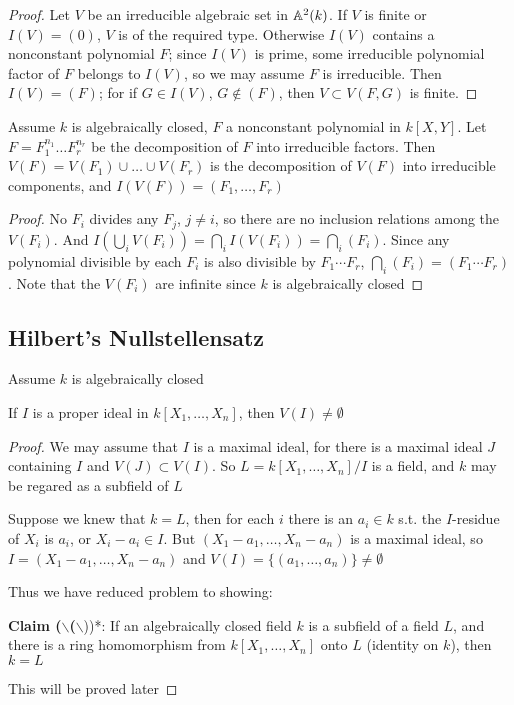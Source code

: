 \documentclass[11pt]{article}
\begin{document}
\begin{proof}
Let \(V\) be an irreducible algebraic set in \(\mathbb{A}^2(k)\). If \(V\) is finite
or \(I(V)=(0)\), \(V\) is of the required type. Otherwise \(I(V)\) contains a nonconstant
polynomial \(F\); since \(I(V)\) is prime, some irreducible polynomial factor of \(F\) belongs
to \(I(V)\), so we may assume \(F\) is irreducible. Then \(I(V)=(F)\); for
if \(G\in I(V)\), \(G\notin(F)\), then \(V\subset V(F,G)\) is finite.
\end{proof}

\begin{corollary}[]
Assume \(k\) is algebraically closed, \(F\) a nonconstant polynomial in \(k[X,Y]\).
Let \(F=F_1^{n_1}\dots F_r^{n_r}\) be the decomposition of \(F\) into irreducible factors.
Then \(V(F)=V(F_1)\cup\dots\cup V(F_r)\) is the decomposition of \(V(F)\) into irreducible components,
and \(I(V(F))=(F_1,\dots,F_r)\)
\end{corollary}

\begin{proof}
No \(F_i\) divides any \(F_j\), \(j\neq i\), so there are no inclusion relations among
the \(V(F_i)\). And \(I(\bigcup_iV(F_i))=\bigcap_iI(V(F_i))=\bigcap_i(F_i)\). Since any polynomial divisible by
each \(F_i\) is also divisible by \(F_1\cdots F_r\), \(\bigcap_i(F_i)=(F_1\cdots F_r)\). Note that the \(V(F_i)\) are
infinite since \(k\) is algebraically closed
\end{proof}
\subsection{Hilbert's Nullstellensatz}
\label{sec:org9bfa291}
Assume \(k\) is algebraically closed

\begin{theorem}
If \(I\) is a proper ideal in \(k[X_1,\dots,X_n]\), then \(V(I)\neq\emptyset\)
\end{theorem}

\begin{proof}
We may assume that \(I\) is a maximal ideal, for there is a maximal ideal \(J\) containing \(I\)
and \(V(J)\subset V(I)\). So \(L=k[X_1,\dots,X_n]/I\) is a field, and \(k\) may be regared as a subfield
of \(L\)

Suppose we knew that \(k=L\), then for each \(i\) there is an \(a_i\in k\) s.t. the \(I\)-residue
of \(X_i\) is \(a_i\), or \(X_i-a_i\in I\). But \((X_1-a_1,\dots,X_n-a_n)\) is a maximal ideal,
so \(I=(X_1-a_1,\dots,X_n-a_n)\) and \(V(I)=\{(a_1,\dots,a_n)\}\neq\emptyset\)

Thus we have reduced problem to showing:

\textbf{Claim ($\backslash$(}$\backslash$))*: If an algebraically closed field \(k\) is a subfield of a field \(L\), and there is a
 ring homomorphism from \(k[X_1,\dots,X_n]\) onto \(L\) (identity on \(k\)), then \(k=L\)

This will be proved later
\end{proof}
\end{document}
